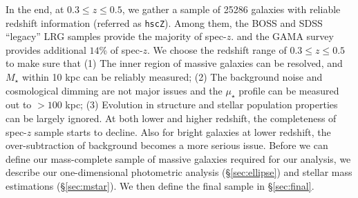 \documentclass[a4paper,fleqn,usenatbib]{mnras}
\def\msun{$M_\odot$}
\def\mstar{{$M_{\star}$}}
\def\logms{{$\log (M_{\star}/M_{\odot})$}}
\def\mden{{$\mu_{\star}$}}
\begin{document}
    In the end, at $0.3 \leq z \leq 0.5$, we gather a sample of 25286 galaxies with 
    reliable redshift information (referred as \texttt{hscZ}).
    Among them, the BOSS and SDSS ``legacy'' LRG samples provide the majority of 
    spec-$z$. and the GAMA survey provides additional $14$\% of spec-$z$.
    We choose the redshift range of $0.3 \leq z \leq 0.5$ to make sure that 
    (1) The inner region of massive galaxies can be resolved, and \mstar{} within 
    10 kpc can be reliably measured; 
    (2) The background noise and cosmological dimming are not major issues and the 
    \mden{} profile can be measured out to $>100$ kpc; 
    (3) Evolution in structure and stellar population properties can be largely 
    ignored.  
    At both lower and higher redshift, the completeness of spec-$z$ sample starts 
    to decline.  
    Also for bright galaxies at lower redshift, the over-subtraction of background 
    becomes a more serious issue. 
    Before we can define our mass-complete sample of massive galaxies required for 
    our analysis, we describe our one-dimensional photometric analysis 
    (\S \ref{sec:ellipse}) and stellar mass estimations (\S \ref{sec:mstar}). 
    We then define the final sample in \S \ref{sec:final}.
    
\end{document}

